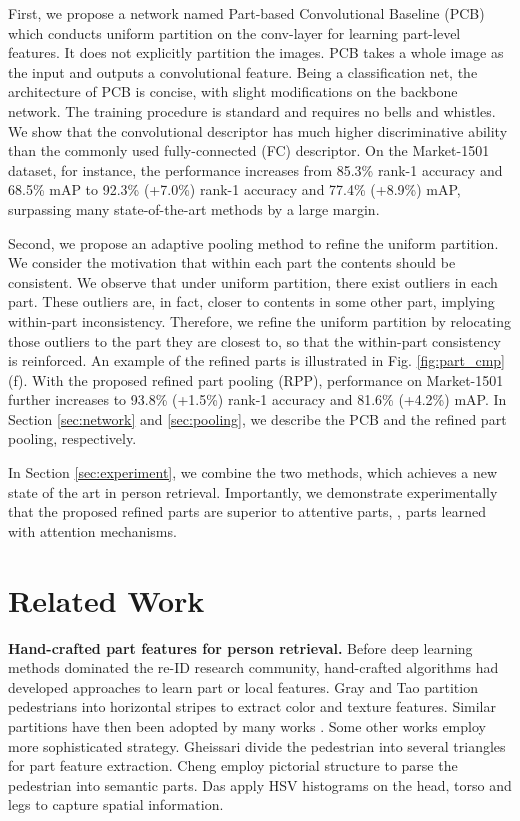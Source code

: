 \documentclass[10pt,twocolumn,letterpaper]{article}
\begin{document}
First, we propose a network named Part-based Convolutional Baseline (PCB) which conducts uniform partition on the conv-layer for learning part-level features. It does not explicitly partition the images. PCB takes a whole image as the input and outputs a convolutional feature. Being a classification net, the architecture of PCB is concise, with slight modifications on the backbone network. The training procedure is standard and requires no bells and whistles. We show that the convolutional descriptor has much higher discriminative ability than the commonly used fully-connected (FC) descriptor. On the Market-1501 dataset, for instance, the performance increases from 85.3\% rank-1 accuracy and 68.5\% mAP to 92.3\% (+7.0\%) rank-1 accuracy and 77.4\% (+8.9\%) mAP, surpassing many state-of-the-art methods by a large margin.

Second, we propose an adaptive pooling method to refine the uniform partition. We consider the motivation that within each part the contents should be consistent. We observe that under uniform partition, there exist outliers in each part. These outliers are, in fact, closer to contents in some other part, implying within-part inconsistency. Therefore, we refine the uniform partition by relocating those outliers to the part they are closest to, so that the within-part consistency is reinforced. An example of the refined parts is illustrated in Fig. \ref{fig:part_cmp}(f). With the proposed refined part pooling (RPP), performance on Market-1501 further increases to 93.8\% (+1.5\%) rank-1 accuracy and 81.6\% (+4.2\%) mAP.
In Section \ref{sec:network} and \ref{sec:pooling}, we describe the PCB and the refined part pooling, respectively.

In Section \ref{sec:experiment}, we combine the two methods, which achieves a new state of the art in person retrieval. Importantly, we demonstrate experimentally that the proposed refined parts are superior to attentive parts, \ie, parts learned with attention mechanisms.  

\section{Related Work}\label{sec:related}

\textbf{Hand-crafted part features for person retrieval.} Before deep learning methods dominated the re-ID research community, hand-crafted algorithms had developed approaches to learn part or local features. Gray and Tao \cite{Gray2008Viewpoint} partition pedestrians into horizontal stripes to extract color and texture features. Similar partitions have then been adopted by many works \cite{Engel2010Person,DBLP:journals/pami/ZhengGX13,Ma2014Domain,DBLP:conf/cvpr/LiaoHZL15}. Some other works employ more sophisticated strategy. Gheissari \etal \cite{Gheissari2006Person} divide the pedestrian into several triangles for part feature extraction. Cheng \etal \cite{cheng2011custom} employ pictorial structure to parse the pedestrian into semantic parts. Das \etal \cite{Das2014Consistent} apply HSV histograms on the head, torso and legs to capture spatial information.  
\end{document}
